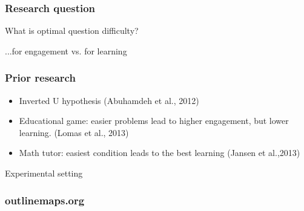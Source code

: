 \documentclass[bigger]{beamer}
\begin{document}
\begin{frame}
  \frametitle{Research question}
	\begin{center}
    {\Huge What is optimal question difficulty?} 

		\bigskip
    {\Huge ...for engagement vs. for learning}
	\end{center}
\end{frame}

\begin{frame}
	\frametitle{Prior research}
	\begin{itemize}
	  \item Inverted U hypothesis (Abuhamdeh et al., 2012)
	  \item Educational game: easier problems lead to higher engagement, but lower learning. (Lomas et al., 2013)
	  \item Math tutor: easiest condition leads to the best learning (Jansen et al.,2013)
	\end{itemize}
\end{frame}

\begin{frame}
	\begin{center}
    {\Huge Experimental setting} 
	\end{center}
\end{frame}

\begin{frame}
  \frametitle{outlinemaps.org}
	\noindent{}
\end{frame}
\end{document}
